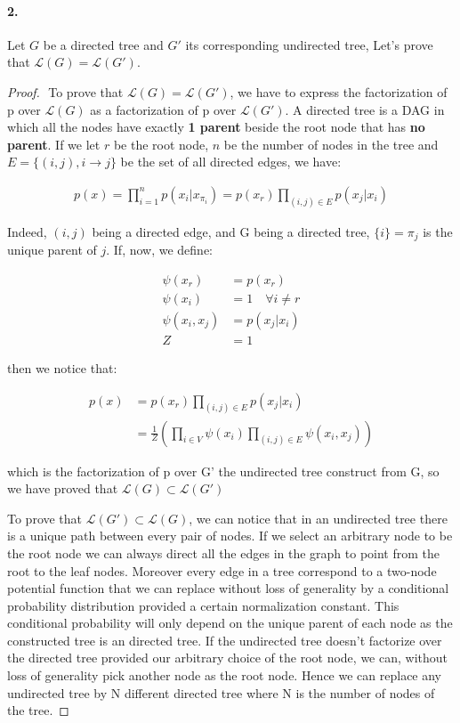 \documentclass[11pt]{article}
\numberwithin{figure}{section} %
\begin{document}
\paragraph{2.} Let $G$ be a directed tree and $G'$ its corresponding undirected tree, Let's prove that $\mathcal{L}(G) = \mathcal{L}(G')$.\\
\begin{proof}
$ $\newline
To prove that $\mathcal{L}(G) = \mathcal{L}(G')$, we have to express the factorization of p over $\mathcal{L}(G)$ as a factorization of p over $\mathcal{L}(G')$.
A directed tree is a DAG in which all the nodes have exactly \textbf{1 parent} beside the root node that has \textbf{no parent}. If we let $r$ be the root node, $n$
be the number of nodes in the tree and $E = \{(i,j), i \rightarrow j\}$ be the set of all directed edges, we have:

\begin{align*}
p(x) = \prod\limits_{i=1}^n p(x_i | x_{\pi_i}) = p(x_r)\prod\limits_{(i,j) \in E} p(x_j | x_i)
\end{align*}

Indeed, $(i, j)$ being a directed edge, and G being a directed tree, $\{i\} = \pi_j$ is the unique parent of $j$.
If, now, we define:

\begin{align*}
\psi(x_r) &= p(x_r) \\
\psi(x_i) &= 1 \quad \forall i \neq r \\
\psi(x_i, x_j) &=  p(x_j | x_i) \\
Z &= 1
\end{align*}

then we notice that:

\begin{align*}
p(x) &= p(x_r)\prod\limits_{(i,j) \in E} p(x_j | x_i) \\
&= \frac{1}{Z}\left(\prod\limits_{i \in V} \psi(x_i) \prod\limits_{(i,j) \in E} \psi(x_i, x_j) \right)
\end{align*}

which is the factorization of p over G' the undirected tree construct from G, so we have proved that $\mathcal{L}(G) \subset \mathcal{L}(G')$

To  prove that $\mathcal{L}(G') \subset \mathcal{L}(G)$, we can notice that in an undirected tree there is a unique path between every pair of nodes. If we select an arbitrary node to be the root node we can always direct all the edges in the graph to point from the root to the leaf nodes. Moreover every edge in a tree correspond to a two-node potential function that we can replace without loss of generality by a conditional probability distribution provided a certain normalization constant. This conditional probability will only depend on the unique parent of each node as the constructed tree is an directed tree. If the undirected tree doesn't factorize over the directed tree provided our arbitrary choice of the root node, we can, without loss of generality pick another node as the root node. Hence we can replace any undirected tree by N different directed tree where N is the number of nodes of the tree.
\end{proof}
\end{document}
